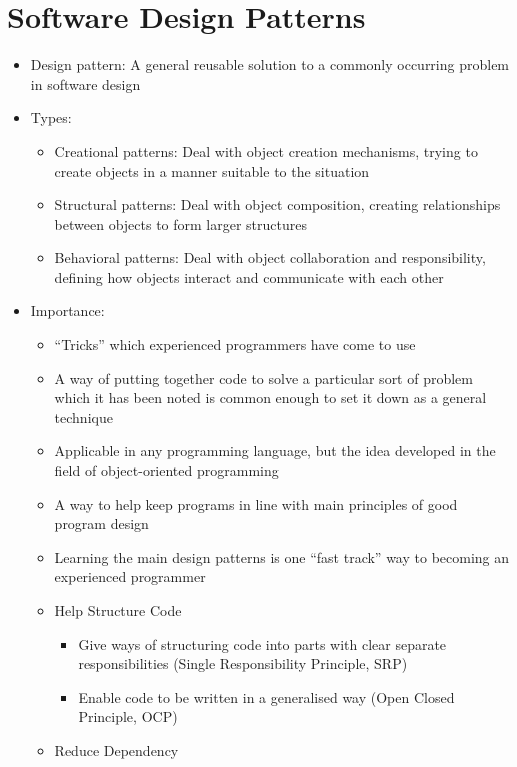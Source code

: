 \documentclass[12pt,openany]{book}
\begin{document}
\section{Software Design Patterns}
\begin{itemize}
    \item Design pattern: A general reusable solution to a commonly occurring problem in software design
    \item Types:
    \begin{itemize}
        \item Creational patterns: Deal with object creation mechanisms, trying to create objects in a manner suitable to the situation
        \item Structural patterns: Deal with object composition, creating relationships between objects to form larger structures
        \item Behavioral patterns: Deal with object collaboration and responsibility, defining how objects interact and communicate with each other
    \end{itemize}
    \item Importance:
    \begin{itemize}
        \item ``Tricks'' which experienced programmers have come to use
        \item A way of putting together code to solve a particular sort of problem which it has been noted is common enough to set it down as a general technique
        \item Applicable in any programming language, but the idea developed in the field of object-oriented programming
        \item A way to help keep programs in line with main principles of good program design
        \item Learning the main design patterns is one “fast track” way to becoming an experienced programmer
        \item Help Structure Code
        \begin{itemize}
            \item Give ways of structuring code into parts with clear separate responsibilities (Single Responsibility Principle, SRP)
            \item Enable code to be written in a generalised way (Open Closed Principle, OCP)
        \end{itemize}
        \item Reduce Dependency
        \begin{itemize}

\end{itemize}
\end{itemize}
\end{itemize}
\end{document}
